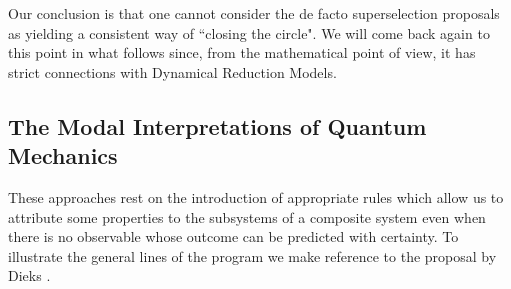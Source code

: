 \documentclass[12pt]{article}
\begin{document}
Our conclusion is that one cannot consider the de facto
superselection proposals as yielding a consistent way of ``closing
the circle". We will come back again to  this point in what follows since,
from the mathematical point of view, it has strict connections with
Dynamical Reduction Models.


\subsection{The Modal Interpretations of Quantum Mechanics}
\label{sec34}

These approaches \cite{mod0,mod1,mod2,mod3,mod4,mod5,vd,bc} rest
on the introduction of appropriate rules which allow us to
attribute some properties to the subsystems of a composite system
even when there is no observable whose outcome can be predicted
with certainty. To illustrate the general lines of the program we
make reference to the proposal by Dieks \cite{mod2}.
\end{document}
